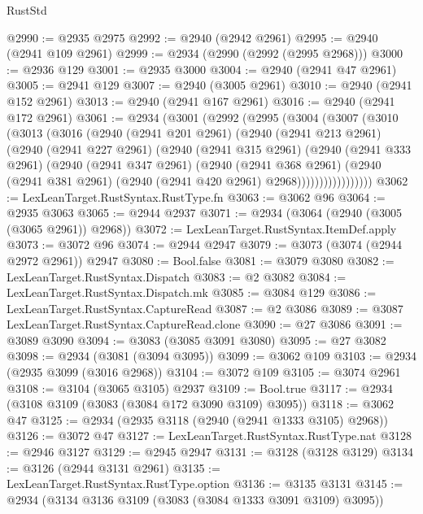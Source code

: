 \begin{lexlean}{RustStd}
\begin{coremodule}
@2990 := @2935 @2975
@2992 := @2940 (@2942 @2961)
@2995 := @2940 (@2941 @109 @2961)
@2999 := @2934 (@2990 (@2992 (@2995 @2968)))
@3000 := @2936 @129
@3001 := @2935 @3000
@3004 := @2940 (@2941 @47 @2961)
@3005 := @2941 @129
@3007 := @2940 (@3005 @2961)
@3010 := @2940 (@2941 @152 @2961)
@3013 := @2940 (@2941 @167 @2961)
@3016 := @2940 (@2941 @172 @2961)
@3061 := @2934
    (@3001
      (@2992
        (@2995
          (@3004
            (@3007
              (@3010
                (@3013
                  (@3016
                    (@2940
                      (@2941 @201 @2961)
                      (@2940
                        (@2941 @213 @2961)
                        (@2940
                          (@2941 @227 @2961)
                          (@2940
                            (@2941 @315 @2961)
                            (@2940
                              (@2941 @333 @2961)
                              (@2940
                                (@2941 @347 @2961)
                                (@2940
                                  (@2941 @368 @2961)
                                  (@2940
                                    (@2941 @381 @2961)
                                    (@2940 (@2941 @420 @2961) @2968)))))))))))))))))
@3062 := LexLeanTarget.RustSyntax.RustType.fn
@3063 := @3062 @96
@3064 := @2935 @3063
@3065 := @2944 @2937
@3071 := @2934 (@3064 (@2940 (@3005 (@3065 @2961)) @2968))
@3072 := LexLeanTarget.RustSyntax.ItemDef.apply
@3073 := @3072 @96
@3074 := @2944 @2947
@3079 := @3073 (@3074 (@2944 @2972 @2961)) @2947
@3080 := Bool.false
@3081 := @3079 @3080
@3082 := LexLeanTarget.RustSyntax.Dispatch
@3083 := @2 @3082
@3084 := LexLeanTarget.RustSyntax.Dispatch.mk
@3085 := @3084 @129
@3086 := LexLeanTarget.RustSyntax.CaptureRead
@3087 := @2 @3086
@3089 := @3087 LexLeanTarget.RustSyntax.CaptureRead.clone
@3090 := @27 @3086
@3091 := @3089 @3090
@3094 := @3083 (@3085 @3091 @3080)
@3095 := @27 @3082
@3098 := @2934 (@3081 (@3094 @3095))
@3099 := @3062 @109
@3103 := @2934 (@2935 @3099 (@3016 @2968))
@3104 := @3072 @109
@3105 := @3074 @2961
@3108 := @3104 (@3065 @3105) @2937
@3109 := Bool.true
@3117 := @2934 (@3108 @3109 (@3083 (@3084 @172 @3090 @3109) @3095))
@3118 := @3062 @47
@3125 := @2934 (@2935 @3118 (@2940 (@2941 @1333 @3105) @2968))
@3126 := @3072 @47
@3127 := LexLeanTarget.RustSyntax.RustType.nat
@3128 := @2946 @3127
@3129 := @2945 @2947
@3131 := @3128 (@3128 @3129)
@3134 := @3126 (@2944 @3131 @2961)
@3135 := LexLeanTarget.RustSyntax.RustType.option
@3136 := @3135 @3131
@3145 := @2934 (@3134 @3136 @3109 (@3083 (@3084 @1333 @3091 @3109) @3095))

\end{coremodule}
\end{lexlean}
